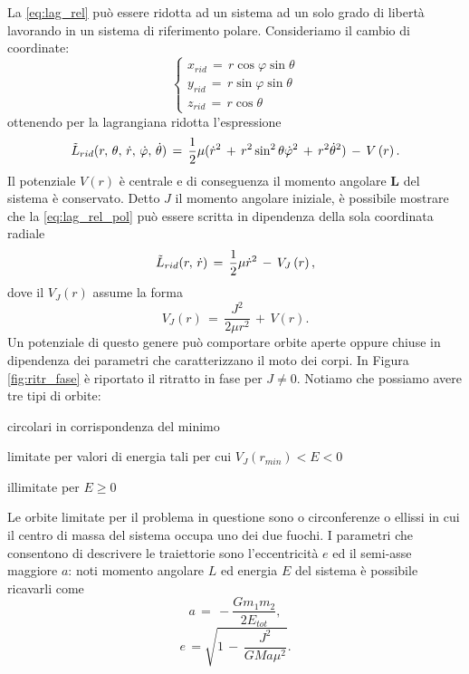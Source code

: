La \eqref{eq:lag_rel} può essere ridotta ad un sistema ad un solo grado di libertà lavorando in un sistema di riferimento polare. Consideriamo il cambio di coordinate:
\begin{equation}
\begin{cases}
x_{rid}\,=\,r\cos{\varphi} \sin{\theta} \\
y_{rid}\,=\,r\sin{\varphi} \sin{\theta} \\
z_{rid}\,=\,r\cos{\theta}
\end{cases}
\label{eq:cambiocoor_rel}
\end{equation}
ottenendo per la lagrangiana ridotta l'espressione
\begin{equation}
\Tilde{L}_{rid}(r,\,\theta,\,\dot{r},\,\dot{\varphi},\,\dot{\theta})\,=\,\frac{1}{2}\mu(\dot{r}^2\,+\,r^2 \sin^2\theta\dot{\varphi}^2\,+\,r^2\dot{\theta}^2)\,-\,V\left(r\right).
\label{eq:lag_rel_pol}
\end{equation}
Il potenziale $V(r)$ è centrale e di conseguenza il momento angolare $\textbf{L}$ del sistema è conservato. Detto $J$ il momento angolare iniziale, è possibile mostrare che la \eqref{eq:lag_rel_pol} può essere scritta in dipendenza della sola coordinata radiale
\begin{equation}
\Tilde{L}_{rid}(r,\,\dot{r})\,=\,\frac{1}{2}\mu\dot{r}^2\,-\,V_J\left(r\right),
\label{eq:lag_solor}
\end{equation}
dove il $V_J(r)$ assume la forma
\begin{equation}
V_J(r)\,=\,\frac{J^2}{2\mu r^2}\,+\,V(r).
\label{eq:pot_eff_kepl}
\end{equation}
Un potenziale di questo genere può comportare orbite aperte oppure chiuse in dipendenza dei parametri che caratterizzano il moto dei corpi. In Figura \ref{fig:ritr_fase} è riportato il ritratto in fase per $J \neq 0$. Notiamo che possiamo avere tre tipi di orbite:
\begin{list}{\textbf{-}}{\setlength{\itemsep}{0cm}}
    \item circolari in corrispondenza del minimo
    \item limitate per valori di energia tali per cui $V_J(r_{min}) < E < 0$
    \item illimitate per $E \geq 0$
\end{list}
Le orbite limitate per il problema in questione sono o circonferenze o ellissi in cui il centro di massa del sistema occupa uno dei due fuochi. I parametri che consentono di descrivere le traiettorie sono l'eccentricità $e$ ed il semi-asse maggiore $a$: noti momento angolare $L$ ed energia $E$ del sistema è possibile ricavarli come
\begin{equation}
a\,=\,-\frac{Gm_1m_2}{2E_{tot}},
\label{eq:semiasse_mag}
\end{equation}
\begin{equation}
e\, = \sqrt{1\,-\,\frac{J^2}{GMa\mu^2}}.
\label{eq:ecc_kepl}
\end{equation}

